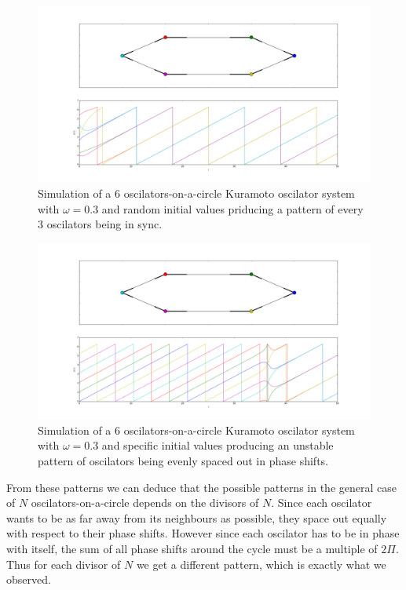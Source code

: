 \begin{figure}[h]
  \centering
  \includegraphics[width=\textwidth]{imgs/circle_6b}
  \caption{Simulation of a 6 oscilators-on-a-circle Kuramoto oscilator system with $\omega = 0.3$ and random initial values priducing a pattern of every 3 oscilators being in sync. }
  \label{fig:circle_6b}
\end{figure}

\begin{figure}[h]
  \centering
  \includegraphics[width=\textwidth]{imgs/circle_6c}
  \caption{Simulation of a 6 oscilators-on-a-circle Kuramoto oscilator system with $\omega = 0.3$ and specific initial values producing an unstable pattern of oscilators being evenly spaced out in phase shifts. }
  \label{fig:circle_6c}
\end{figure}

From these patterns we can deduce that the possible patterns in the general case of $N$ oscilators-on-a-circle depends on the divisors of $N$. Since each oscilator wants to be as far away from its neighbours as possible, they space out equally with respect to their phase shifts. However since each oscilator has to be in phase with itself, the sum of all phase shifts around the cycle must be a multiple of $2\Pi$. Thus for each divisor of $N$ we get a different pattern, which is exactly what we observed. 